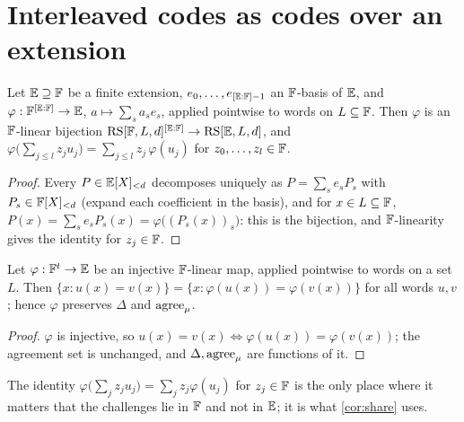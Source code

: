 \section{Interleaved codes as codes over an extension}

\begin{lemma}[Interleaved code $=$ extension-field code]\label{lem:ext}
Let $\mathbb{E}\supseteq\mathbb{F}$ be a finite extension, $e_0,\dots,e_{[\mathbb{E}:\mathbb{F}]-1}$ an $\mathbb{F}$-basis of
$\mathbb{E}$, and $\varphi:\mathbb{F}^{[\mathbb{E}:\mathbb{F}]}\to\mathbb{E}$, $a\mapsto\sum_s a_se_s$, applied pointwise to words on
$L\subseteq\mathbb{F}$. Then $\varphi$ is an $\mathbb{F}$-linear bijection $\mathrm{RS}[\mathbb{F},L,d]^{[\mathbb{E}:\mathbb{F}]}\to\mathrm{RS}[\mathbb{E},L,d]$, and
$\varphi\big(\sum_{j\le l} z_ju_j\big)=\sum_{j\le l} z_j\,\varphi(u_j)$ for $z_0,\dots,z_l\in\mathbb{F}$.
\end{lemma}

\begin{proof}
Every $P\in\mathbb{E}[X]_{<d}$ decomposes uniquely as $P=\sum_s e_sP_s$ with $P_s\in\mathbb{F}[X]_{<d}$ (expand
each coefficient in the basis), and for $x\in L\subseteq\mathbb{F}$,
$P(x)=\sum_s e_sP_s(x)=\varphi\big((P_s(x))_s\big)$: this is the bijection, and
$\mathbb{F}$-linearity gives the identity for $z_j\in\mathbb{F}$.
\end{proof}

\begin{lemma}\label{lem:ext-agree}
Let $\varphi:\mathbb{F}^t\to\mathbb{E}$ be an injective $\mathbb{F}$-linear map, applied pointwise to words on a set $L$.
Then $\{x:u(x)=v(x)\}=\{x:\varphi(u(x))=\varphi(v(x))\}$ for all words $u,v$; hence $\varphi$
preserves $\Delta$ and $\mathrm{agree}_\mu$.
\end{lemma}

\begin{proof}
$\varphi$ is injective, so $u(x)=v(x)\iff\varphi(u(x))=\varphi(v(x))$; the agreement set is
unchanged, and $\Delta,\mathrm{agree}_\mu$ are functions of it.
\end{proof}

\begin{remark}
The identity $\varphi\big(\sum_jz_ju_j\big)=\sum_jz_j\varphi(u_j)$ for $z_j\in\mathbb{F}$ is the only place
where it matters that the challenges lie in $\mathbb{F}$ and not in $\mathbb{E}$; it is what \cref{cor:share} uses.
\end{remark}
